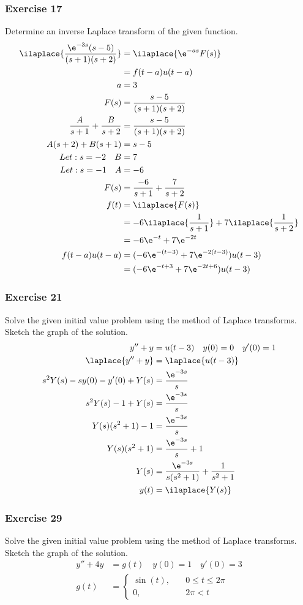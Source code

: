 \documentclass{math}
\begin{document}
\subsubsection*{Exercise 17}
Determine an inverse Laplace transform of the given function.
\begin{align*}
  \ilaplace{\frac{\e^{-3s}(s-5)}{(s+1)(s+2)}} &= \ilaplace{\e^{-as}F(s)} \\
  &= f(t-a)u(t-a) \\
  a &= 3 \\
  F(s) &= \frac{s-5}{(s+1)(s+2)} \\
  \frac{A}{s+1}+\frac{B}{s+2} &= \frac{s-5}{(s+1)(s+2)} \\
  A(s+2)+B(s+1) &= s-5 \\
  Let: s = -2 \quad B &= 7 \\
  Let: s = -1 \quad A &= -6 \\
  F(s) &= \frac{-6}{s+1}+\frac{7}{s+2} \\
  f(t) &= \ilaplace{F(s)} \\
  &= -6\ilaplace{\frac{1}{s+1}}+7\ilaplace{\frac{1}{s+2}} \\
  &= -6\e^{-t}+7\e^{-2t} \\
  f(t-a)u(t-a) &= (-6\e^{-(t-3)}+7\e^{-2(t-3)})u(t-3) \\
  &= (-6\e^{-t+3}+7\e^{-2t+6})u(t-3)
\end{align*}

\subsubsection*{Exercise 21}
Solve the given initial value problem using the method of Laplace transforms.
Sketch the graph of the solution.
\begin{align*}
  y''+y &= u(t-3) \quad y(0) = 0 \quad y'(0) = 1 \\
  \laplace{y''+y} &= \laplace{u(t-3)} \\
  s^2Y(s)-sy(0)-y'(0)+Y(s) &= \frac{\e^{-3s}}{s} \\
  s^2Y(s)-1+Y(s) &= \frac{\e^{-3s}}{s} \\
  Y(s)(s^2+1)-1 &= \frac{\e^{-3s}}{s} \\
  Y(s)(s^2+1) &= \frac{\e^{-3s}}{s}+1 \\
  Y(s) &= \frac{\e^{-3s}}{s(s^2+1)}+\frac{1}{s^2+1} \\
  y(t) &= \ilaplace{Y(s)} \\
\end{align*}

\subsubsection*{Exercise 29}
Solve the given initial value problem using the method of Laplace transforms.
Sketch the graph of the solution.
\begin{align*}
  y''+4y &= g(t) \quad y(0) = 1 \quad y'(0) = 3 \\
  g(t) &= \begin{cases}
    \sin(t), &\quad 0\le t\le 2\pi \\
    0, &\quad 2\pi<t
  \end{cases}
\end{align*}
\end{document}
